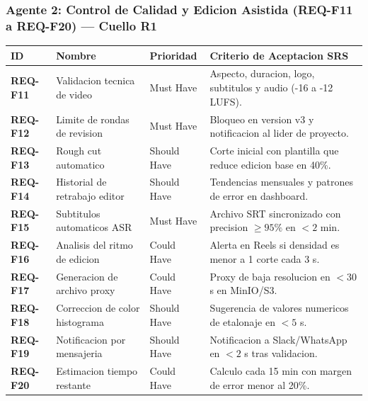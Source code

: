\documentclass[11pt,a4paper]{article}
\begin{document}
\subsubsection*{Agente 2: Control de Calidad y Edicion Asistida (REQ-F11 a REQ-F20) --- Cuello R1}
\begin{longtable}{p{2.2cm}p{4.5cm}p{2.5cm}p{5.8cm}}
\toprule
ID & Nombre & Prioridad & Criterio de Aceptacion SRS \\
\midrule
\endhead
\bottomrule
\endfoot
\textbf{REQ-F11} & Validacion tecnica de video & Must Have & Aspecto, duracion, logo, subtitulos y audio (-16 a -12 LUFS). \\
\textbf{REQ-F12} & Limite de rondas de revision & Must Have & Bloqueo en version v3 y notificacion al lider de proyecto. \\
\textbf{REQ-F13} & Rough cut automatico & Should Have & Corte inicial con plantilla que reduce edicion base en 40\%. \\
\textbf{REQ-F14} & Historial de retrabajo editor & Should Have & Tendencias mensuales y patrones de error en dashboard. \\
\textbf{REQ-F15} & Subtitulos automaticos ASR & Must Have & Archivo SRT sincronizado con precision $\ge 95\%$ en $<2$ min. \\
\textbf{REQ-F16} & Analisis del ritmo de edicion & Could Have & Alerta en Reels si densidad es menor a 1 corte cada 3 s. \\
\textbf{REQ-F17} & Generacion de archivo proxy & Could Have & Proxy de baja resolucion en $<30$ s en MinIO/S3. \\
\textbf{REQ-F18} & Correccion de color histograma& Should Have & Sugerencia de valores numericos de etalonaje en $<5$ s. \\
\textbf{REQ-F19} & Notificacion por mensajeria & Should Have & Notificacion a Slack/WhatsApp en $<2$ s tras validacion. \\
\textbf{REQ-F20} & Estimacion tiempo restante & Could Have & Calculo cada 15 min con margen de error menor al 20\%. \\
\end{longtable}
\end{document}
